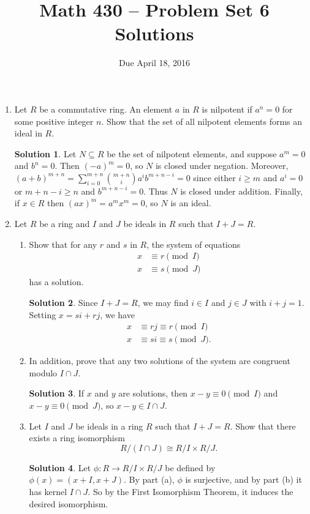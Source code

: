 \documentclass{article}
\title{Math 430 -- Problem Set 6 Solutions}
\date{Due April 18, 2016}
\theoremstyle{definition}
\newtheorem*{solution}{Solution}
\begin{document}
\maketitle


\begin{enumerate}
\item[16.27.] Let $R$ be a commutative ring.  An element $a$ in $R$ is nilpotent if $a^n = 0$ for some positive integer $n$.  Show that the set of all nilpotent elements forms an ideal in $R$.
\begin{solution} 
Let $N \subseteq R$ be the set of nilpotent elements, and suppose $a^m = 0$ and $b^n = 0$.  Then $(-a)^m = 0$, so $N$ is closed under negation.  Moreover, $(a + b)^{m+n} = \sum_{i=0}^{m+n} \binom{m+n}{i} a^i b^{m+n-i} = 0$ since either $i \ge m$ and $a^i = 0$ or $m+n-i \ge n$ and $b^{m+n-i} = 0$.  Thus $N$ is closed under addition.  Finally, if $x \in R$ then $(ax)^m = a^mx^m = 0$, so $N$ is an ideal.
\end{solution}
\item[16.40.] Let $R$ be a ring and $I$ and $J$ be ideals in $R$ such that $I + J = R$.
\begin{enumerate}
\item Show that for any $r$ and $s$ in $R$, the system of equations
\begin{align*}
x &\equiv r \pmod{I} \\
x &\equiv s \pmod{J}
\end{align*}
has a solution.
\begin{solution}
Since $I + J = R$, we may find $i \in I$ and $j \in J$ with $i + j = 1$.  Setting $x = si + rj$, we have
\begin{align*}
x &\equiv rj \equiv r \pmod{I} \\
x &\equiv si \equiv s \pmod{J}.
\end{align*}
\end{solution}
\item In addition, prove that any two solutions of the system are congruent modulo $I \cap J$.
\begin{solution}
If $x$ and $y$ are solutions, then $x - y \equiv 0 \pmod{I}$ and $x - y \equiv 0 \pmod{J}$, so $x - y \in I \cap J$.
\end{solution}
\item Let $I$ and $J$ be ideals in a ring $R$ such that $I + J = R$. Show that there exists a ring isomorphism
\[
R / (I \cap J) \cong R/I \times R/J.
\]
\begin{solution}
Let $\phi : R \to R/I \times R/J$ be defined by $\phi(x) = (x + I, x + J)$.  By part (a), $\phi$ is surjective, and by part (b) it has kernel $I \cap J$.  So by the First Isomorphism Theorem, it induces the desired isomorphism.

\end{solution}
\end{enumerate}
\end{enumerate}
\end{document}
